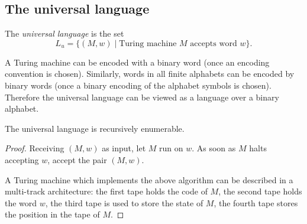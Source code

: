 \begin{page}
\setcounter{section}{8}
\setcounter{subsection}{4}
\setcounter{dfn}{5}
\label{portion:1345}

\subsection{The universal language}

\end{page}

\begin{page}
\setcounter{section}{8}
\setcounter{subsection}{4}
\setcounter{dfn}{6}
\label{portion:1347}

\begin{dfn}
The \emph{universal language} is the set
\[
L_u = \{(M,w) \mid \text{Turing machine }M \text{ accepts word }w\}.
\]
\end{dfn}

\end{page}

\begin{page}
\setcounter{section}{8}
\setcounter{subsection}{4}
\setcounter{dfn}{6}
\label{portion:1348}

A Turing machine can be encoded with a binary word (once an encoding convention is chosen).
Similarly, words in all finite alphabets can be encoded by binary words (once a binary encoding of the alphabet symbols is chosen).
Therefore the universal language can be viewed as a language over a binary alphabet.


\end{page}

\begin{page}
\setcounter{section}{8}
\setcounter{subsection}{4}
\setcounter{dfn}{7}
\label{portion:1350}

\begin{lem}
\label{lem:UniLangRE}
The universal language is recursively enumerable.
\end{lem}

\end{page}

\begin{page}
\setcounter{section}{8}
\setcounter{subsection}{5}
\setcounter{dfn}{7}
\label{portion:1351}

\begin{proof}
Receiving $(M, w)$ as input, let $M$ run on $w$.
As soon as $M$ halts accepting $w$, accept the pair $(M,w)$.

A Turing machine which implements the above algorithm can be described in a multi-track architecture:
the first tape holds the code of $M$, the second tape holds the word $w$, the third tape is used to store the state of $M$,
the fourth tape stores the position in the tape of $M$.
\end{proof}





\end{page}

